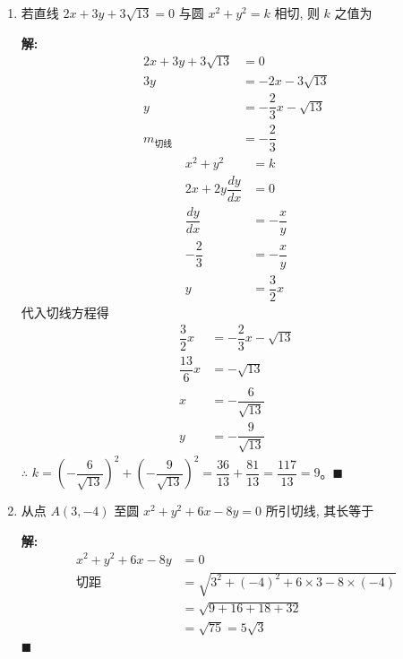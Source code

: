 \documentclass[10pt]{article}
\newcommand{\sol}{\textbf{解:} }
\begin{document}
\begin{enumerate}[leftmargin=*]
  \item 若直线 $2 x+3 y+3 \sqrt{13}=0$ 与圆 $x^{2}+y^{2}=k$ 相切, 则 $k$ 之值为

        \sol{}
        \begin{align*}
          2x + 3y + 3\sqrt{13} & = 0                          \\
          3y                   & = -2x - 3\sqrt{13}           \\
          y                    & = -\dfrac{2}{3}x - \sqrt{13} \\
          m_{\text{切线}}        & = -\dfrac{2}{3}
        \end{align*}
        \begin{align*}
          x^{2}+y^{2}           & = k             \\
          2x + 2y\dfrac{dy}{dx} & = 0             \\
          \dfrac{dy}{dx}        & = -\dfrac{x}{y} \\
          -\dfrac{2}{3}         & = -\dfrac{x}{y} \\
          y                     & = \dfrac{3}{2}x
        \end{align*}
        代入切线方程得
        \begin{align*}
          \dfrac{3}{2}x  & = -\dfrac{2}{3}x - \sqrt{13} \\
          \dfrac{13}{6}x & = -\sqrt{13}                 \\
          x              & = -\dfrac{6}{\sqrt{13}}      \\
          y              & = -\dfrac{9}{\sqrt{13}}
        \end{align*}
        $\therefore$ $k = \left(-\dfrac{6}{\sqrt{13}}\right)^{2} + \left(-\dfrac{9}{\sqrt{13}}\right)^{2} = \dfrac{36}{13} + \dfrac{81}{13} = \dfrac{117}{13} = 9$。\hfill$\blacksquare$

  \item 从点 $A(3,-4)$ 至圆 $x^{2}+y^{2}+6 x-8 y=0$ 所引切线, 其长等于

        \sol{}
        \begin{align*}
          x^{2}+y^{2}+6 x-8 y & = 0                                                    \\
          \text{切距}           & = \sqrt{3^{2} + (-4)^{2} + 6 \times 3 - 8 \times (-4)} \\
                              & = \sqrt{9 + 16 + 18 + 32}                              \\
                              & = \sqrt{75} = 5\sqrt{3}
        \end{align*} \hfill$\blacksquare$


\end{enumerate}
\end{document}
